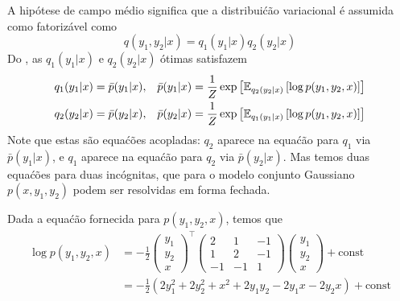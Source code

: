 \begin{exenumerate}
    \begin{solution}
        A hip\'otese de campo m\'edio significa que a distribui\'c\~ao variacional \'e assumida como fatoriz\'avel como
        \begin{equation}
            q(y_1, y_2 | x) = q_1(y_1 | x) q_2(y_2 | x)
        \end{equation}
        Do , as $q_1(y_1|x)$ e $q_2(y_2|x)$ \'otimas satisfazem
        \begin{align}
            q_1(y_1|x) &=  \bar{p}(y_1|x), &  \bar{p}(y_1|x) &= \frac{1}{Z} \exp\left[ \mathbb{E}_{q_2(y_2|x)}\left[ \log p(y_1, y_2, x)\right] \right]\\
            q_2(y_2|x) &=  \bar{p}(y_2|x), &  \bar{p}(y_2|x) &= \frac{1}{Z} \exp\left[ \mathbb{E}_{q_1(y_1|x)}\left[ \log p(y_1, y_2, x)\right] \right]
        \end{align}
        Note que estas s\~ao equa\'c\~oes acopladas: $q_2$ aparece na
        equa\'c\~ao para $q_1$ via $\bar{p}(y_1|x)$, e $q_1$ aparece na
        equa\'c\~ao para $q_2$ via $\bar{p}(y_2|x)$. Mas temos duas
        equa\'c\~oes para duas inc\'ognitas, que para o modelo conjunto Gaussiano
        $p(x, y_1, y_2)$ podem ser resolvidas em forma fechada.
        
        Dada a equa\'c\~ao fornecida para $p(y_1, y_2, x)$, temos que
        \begin{align}
            \log p(y_1, y_2, x) & = -\frac{1}{2} \begin{pmatrix}
                y_1\\
                y_2\\
                x
            \end{pmatrix}^\top
            \begin{pmatrix}
                2 & 1 & -1\\
                1 & 2 & -1\\
                -1 & -1 & 1
            \end{pmatrix}
            \begin{pmatrix}
                y_1\\
                y_2\\
                x
            \end{pmatrix} + \text{const}\\
            & = -\frac{1}{2} \left( 2 y_1^2 + 2 y_2^2 + x^2 + 2 y_1 y_2 - 2 y_1 x - 2y_2 x \right) + \text{const}
        \end{align}
        

\end{solution}
\end{exenumerate}
